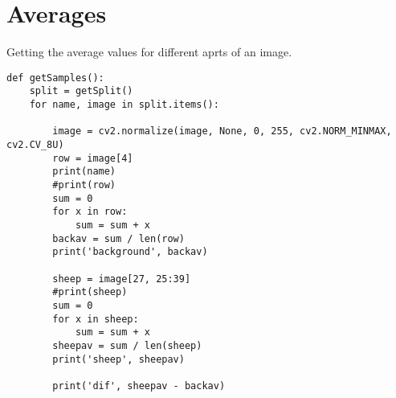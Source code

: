 \section{Averages}
\label{Appendix:code:averages}
Getting the average values for different aprts of an image.
\begin{verbatim}
def getSamples():
    split = getSplit()
    for name, image in split.items():

        image = cv2.normalize(image, None, 0, 255, cv2.NORM_MINMAX, cv2.CV_8U)
        row = image[4]
        print(name)
        #print(row)
        sum = 0
        for x in row:
            sum = sum + x
        backav = sum / len(row)
        print('background', backav)

        sheep = image[27, 25:39]
        #print(sheep)
        sum = 0
        for x in sheep:
            sum = sum + x
        sheepav = sum / len(sheep)
        print('sheep', sheepav)

        print('dif', sheepav - backav)
\end{verbatim}